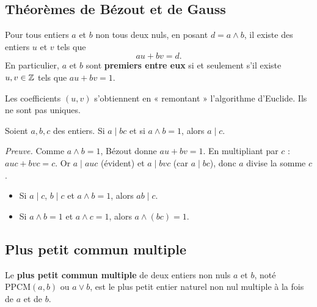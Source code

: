 \subsection{Théorèmes de Bézout et de Gauss}

\begin{theoreme}
Pour tous entiers $a$ et $b$ non tous deux nuls, en posant $d=a\wedge b$, il existe des entiers $u$ et $v$ tels que
\[
a u+b v=d.
\]
En particulier, $a$ et $b$ sont \textbf{premiers entre eux} si et seulement s'il existe $u,v\in\mathbb{Z}$ tels que $a u+b v=1$.
\end{theoreme}

\begin{remarque}
Les coefficients $(u,v)$ s'obtiennent en « remontant » l'algorithme d'Euclide. Ils ne sont pas uniques.
\end{remarque}

\begin{theoreme}
Soient $a,b,c$ des entiers. Si $a\mid bc$ et si $a\wedge b=1$, alors $a\mid c$.
\end{theoreme}

\begin{remarque}
\emph{Preuve.} Comme $a\wedge b=1$, Bézout donne $au+bv=1$. En multipliant par $c$ : $auc+bvc=c$. Or $a\mid auc$ (évident) et $a\mid bvc$ (car $a\mid bc$), donc $a$ divise la somme $c$.
\end{remarque}

\begin{propriete}
\begin{itemize}
\item Si $a\mid c$, $b\mid c$ et $a\wedge b=1$, alors $ab\mid c$.
\item Si $a\wedge b=1$ et $a\wedge c=1$, alors $a\wedge(bc)=1$.
\end{itemize}
\end{propriete}

\subsection{Plus petit commun multiple}

\begin{definition}[PPCM]
Le \textbf{plus petit commun multiple} de deux entiers non nuls $a$ et $b$, noté $\mathrm{PPCM}(a,b)$ ou $a\vee b$, est le plus petit entier naturel non nul multiple à la fois de $a$ et de $b$.
\end{definition}

